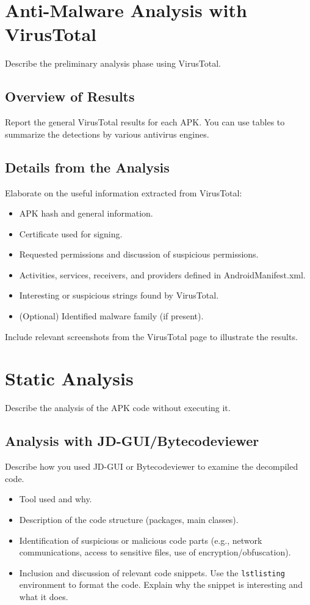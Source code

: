 \section{Anti-Malware Analysis with VirusTotal}
\label{sec:virustotal}
Describe the preliminary analysis phase using VirusTotal.

\subsection{Overview of Results}
\label{subsec:virustotal_overview}
Report the general VirusTotal results for each APK. You can use tables to summarize the detections by various antivirus engines.

\subsection{Details from the Analysis}
\label{subsec:virustotal_details}
Elaborate on the useful information extracted from VirusTotal:
\begin{itemize}
    \item APK hash and general information.
    \item Certificate used for signing.
    \item Requested permissions and discussion of suspicious permissions.
    \item Activities, services, receivers, and providers defined in AndroidManifest.xml.
    \item Interesting or suspicious strings found by VirusTotal.
    \item (Optional) Identified malware family (if present).
\end{itemize}
Include relevant screenshots from the VirusTotal page to illustrate the results.

\newpage %
\section{Static Analysis}
\label{sec:static_analysis}
Describe the analysis of the APK code without executing it.

\subsection{Analysis with JD-GUI/Bytecodeviewer}
\label{subsec:static_jdgui}
Describe how you used JD-GUI or Bytecodeviewer to examine the decompiled code.
\begin{itemize}
    \item Tool used and why.
    \item Description of the code structure (packages, main classes).
    \item Identification of suspicious or malicious code parts (e.g., network communications, access to sensitive files, use of encryption/obfuscation).
    \item Inclusion and discussion of relevant code snippets. Use the \texttt{lstlisting} environment to format the code. Explain why the snippet is interesting and what it does.
\end{itemize}

